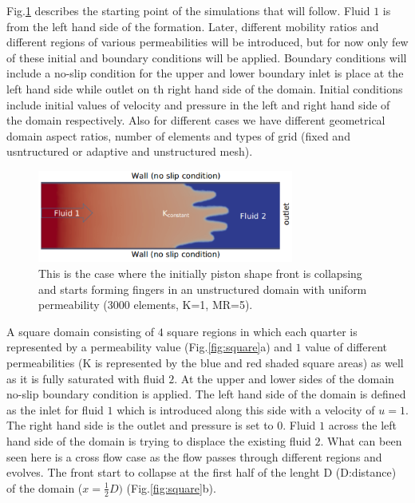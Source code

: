 \documentclass[preprint,authoryear,12pt]{elsarticle}
\begin{document}
Fig.\ref{fig:simple_case} describes the starting point of the simulations that will follow. Fluid $1$ is from the left hand side of the formation. Later, different mobility ratios and different regions of various permeabilities will be introduced, but for now only few of these initial and boundary conditions will be applied. Boundary conditions will include a no-slip condition for the upper and lower boundary inlet is place at the left hand side while outlet on th right hand side of the domain. Initial conditions include initial values of velocity and pressure in the left and right hand side of the domain respectively. Also for different cases we have different geometrical domain aspect ratios, number of elements and types of grid (fixed and usntructured or adaptive and unstructured mesh). 


\begin{figure}[h]
\centering
\vbox{\includegraphics[width=0.75\textwidth]{./Pics/phase_vol_frac_uni_perm_1.pdf}}
\caption{This is the case where the initially piston shape front is collapsing and starts forming fingers in an unstructured domain with uniform permeability (3000 elements, K=1, MR=5).}
\label{fig:simple_case}
\end{figure}

\noindent A square domain consisting of $4$ square regions in which each quarter is represented by a permeability value (Fig.\ref{fig:square}a) and $1$ value of different permeabilities (K is represented by the blue and red shaded square areas) as well as it is fully saturated with fluid $2$. At the upper and lower sides of the domain no-slip boundary condition is applied. The left hand side of the domain is defined as the inlet for fluid $1$ which is introduced along this side with a velocity of $u=1$. The right hand side is the outlet and pressure is set to $0$. Fluid $1$ across the left hand side of the domain is trying to displace the existing fluid $2$. What can been seen here is a cross flow case as the flow passes through different regions and evolves. The front start to collapse at the first half of the lenght D (D:distance) of the domain ($x= \frac{1}{2} D)$ (Fig.\ref{fig:square}b).
\end{document}
